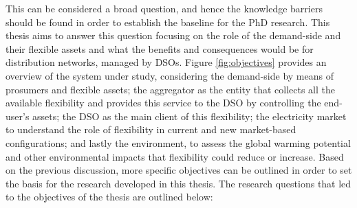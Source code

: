 This can be considered a broad question, and hence the knowledge barriers should be found in order to establish the baseline for the PhD research. This thesis aims to answer this question focusing on the role of the demand-side and their flexible assets and what the benefits and consequences would be for distribution networks, managed by DSOs. Figure \ref{fig:objectives} provides an overview of the system under study, considering the demand-side by means of prosumers and flexible assets; the aggregator as the entity that collects all the available flexibility and provides this service to the DSO by controlling the end-user's assets; the DSO as the main client of this flexibility; the electricity market to understand the role of flexibility in current and new market-based configurations; and lastly the environment, to assess the global warming potential and other environmental impacts that flexibility could reduce or increase. Based on the previous discussion, more specific objectives can be outlined in order to set the basis for the research developed in this thesis. The research questions that led to the objectives of the thesis are outlined below: 
\vspace*{2mm}


